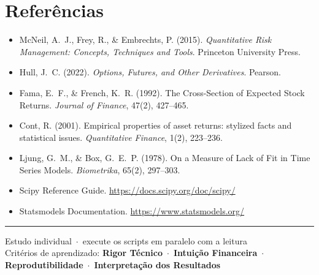 \documentclass[11pt,a4paper]{article}
\theoremstyle{quant}
\begin{document}
\vspace{1.5em}

\section*{Referências}

\begin{itemize}
  \item McNeil, A.~J., Frey, R., \& Embrechts, P. (2015).
    \textit{Quantitative Risk Management: Concepts, Techniques and Tools}.
    Princeton University Press.

  \item Hull, J.~C. (2022). \textit{Options, Futures, and Other Derivatives}.
    Pearson.

  \item Fama, E.~F., \& French, K.~R. (1992). The Cross-Section of
    Expected Stock Returns. \textit{Journal of Finance}, 47(2), 427--465.

  \item Cont, R. (2001). Empirical properties of asset returns: stylized
    facts and statistical issues. \textit{Quantitative Finance}, 1(2), 223--236.

  \item Ljung, G.~M., \& Box, G.~E.~P. (1978). On a Measure of Lack of
    Fit in Time Series Models. \textit{Biometrika}, 65(2), 297--303.

  \item Scipy Reference Guide. \url{https://docs.scipy.org/doc/scipy/}

  \item Statsmodels Documentation. \url{https://www.statsmodels.org/}
\end{itemize}

\vfill
\textcolor{quantpurple}{\rule{\textwidth}{1.2pt}}

\vspace{0.6em}
\begin{center}
  \textcolor{quantgray}{\small\sffamily
    Estudo individual \,$\cdot$\, execute os scripts em paralelo com a leitura\\[4pt]
    Critérios de aprendizado:\;
    \textbf{Rigor Técnico} \,$\cdot$\,
    \textbf{Intuição Financeira} \,$\cdot$\,
    \textbf{Reprodutibilidade} \,$\cdot$\,
    \textbf{Interpretação dos Resultados}
  }
\end{center}
\end{document}

